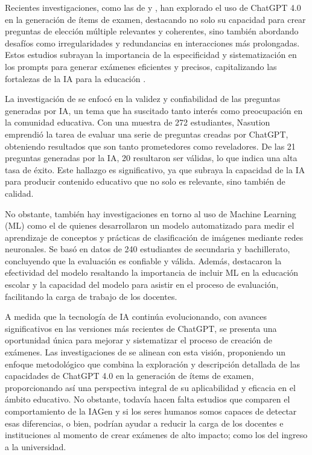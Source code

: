 Recientes investigaciones, como las de \textcite{Nasution2023} y \textcite{Ruiz2023},
han explorado el uso de ChatGPT 4.0 en la generación de ítems de examen,
destacando no solo su capacidad para crear preguntas de elección
múltiple relevantes y coherentes, sino también abordando desafíos como
irregularidades y redundancias en interacciones más prolongadas. Estos
estudios subrayan la importancia de la especificidad y sistematización
en los prompts para generar exámenes eficientes y precisos,
capitalizando las fortalezas de la IA para la educación \cite{Nasution2023, Ruiz2023}.

La investigación de \textcite{Nasution2023} se enfocó en la validez y
confiabilidad de las preguntas generadas por IA, un tema que ha
suscitado tanto interés como preocupación en la comunidad educativa. Con
una muestra de 272 estudiantes, Nasution emprendió la tarea de evaluar
una serie de preguntas creadas por ChatGPT, obteniendo resultados que
son tanto prometedores como reveladores. De las 21 preguntas generadas
por la IA, 20 resultaron ser válidas, lo que indica una alta tasa de
éxito. Este hallazgo es significativo, ya que subraya la capacidad de la
IA para producir contenido educativo que no solo es relevante, sino
también de calidad.

No obstante, también hay investigaciones en torno al uso de Machine
Learning (ML) como el de \textcite{Rauber2024} quienes desarrollaron un
modelo automatizado para medir el aprendizaje de conceptos y prácticas
de clasificación de imágenes mediante redes neuronales. Se basó en datos
de 240 estudiantes de secundaria y bachillerato, concluyendo que la
evaluación es confiable y válida. Además, destacaron la efectividad del
modelo resaltando la importancia de incluir ML en la educación escolar y
la capacidad del modelo para asistir en el proceso de evaluación,
facilitando la carga de trabajo de los docentes.

A medida que la tecnología de IA continúa evolucionando, con avances
significativos en las versiones más recientes de ChatGPT, se presenta
una oportunidad única para mejorar y sistematizar el proceso de creación
de exámenes. Las investigaciones de \textcite{Nasution2023,Ruiz2023} se
alinean con esta visión, proponiendo un enfoque metodológico que combina
la exploración y descripción detallada de las capacidades de ChatGPT 4.0
en la generación de ítems de examen, proporcionando así una perspectiva
integral de su aplicabilidad y eficacia en el ámbito educativo. No
obstante, todavía hacen falta estudios que comparen el comportamiento de
la IAGen y si los seres humanos somos capaces de detectar esas
diferencias, o bien, podrían ayudar a reducir la carga de los docentes e
instituciones al momento de crear exámenes de alto impacto; como los del
ingreso a la universidad.

